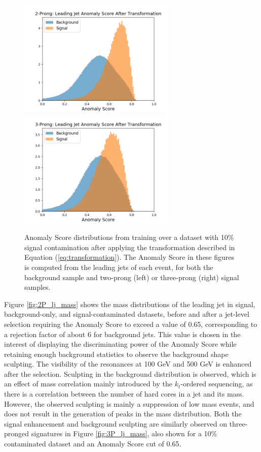 \documentclass[11pt, a4paper]{article}
\begin{document}
\begin{figure}[H]
	\begin{center}
		\includegraphics[width=213pt]{imgs/2Prong_Contaminated_10p0_J_Score_Multi_Lead_SaveForPaper.png}
		\includegraphics[width=213pt]{imgs/3Prong_Contaminated_10p0_J_Score_Multi_Lead_SaveForPaper.png}
	\end{center}

	\caption{Anomaly Score distributions from training over a dataset with 10\% signal contamination after applying the transformation described in Equation (\ref{eq:transformation}). The Anomaly Score in these figures is computed from the leading jets of each event, for both the background sample and two-prong (left) or three-prong (right) signal samples.}

	\label{fig:score_transform}
\end{figure}

Figure \ref{fig:2P_lj_mass} shows the mass distributions of the leading jet in signal, background-only, and signal-contaminated datasets, before and after a jet-level selection requiring the Anomaly Score to exceed a value of 0.65, corresponding to a rejection factor of about 6 for background jets.
This value is chosen in the interest of displaying the discriminating power of the Anomaly Score while retaining enough background statistics to observe the background shape sculpting. 
The visibility of the resonances at 100 GeV and 500 GeV is enhanced after the selection. Sculpting in the background distribution is observed, which is an effect of mass correlation mainly introduced by the $k_{t}$-ordered sequencing, as there is a correlation between the number of hard cores in a jet and its mass. However, the observed sculpting is mainly a suppression of low mass events, and does not result in the generation of peaks in the mass distribution. Both the signal enhancement and background sculpting are similarly observed on three-pronged signatures in Figure \ref{fig:3P_lj_mass}, also shown for a 10\% contaminated dataset and an Anomaly Score cut of 0.65.  
\end{document}
